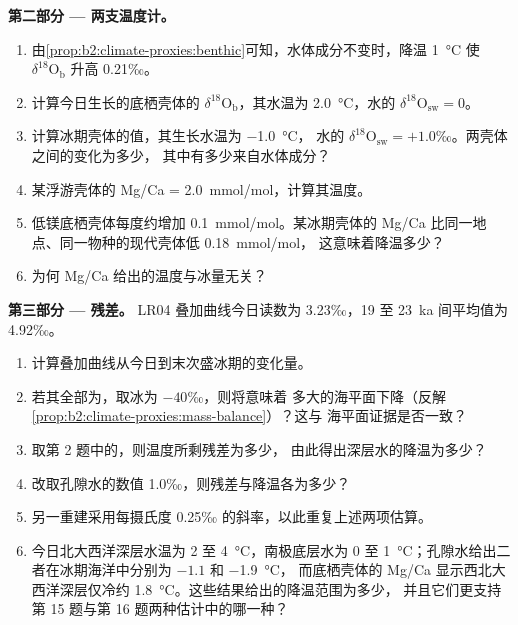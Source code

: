 \begin{problem}
\medskip\noindent\textbf{第二部分 --- 两支温度计。}
\begin{enumerate}[resume]
  \item 由\cref{prop:b2:climate-proxies:benthic}可知，水体成分不变时，降温 \qty{1}{\celsius} 使
        $\delta^{18}\mathrm{O}_{\mathrm{b}}$ 升高 \num{0.21}‰。
  \item 计算今日生长的底栖壳体的 $\delta^{18}\mathrm{O}_{\mathrm{b}}$，其水温为
        \qty{2.0}{\celsius}，水的 $\delta^{18}\mathrm{O}_{\mathrm{sw}} = 0$。
  \item 计算冰期壳体的值，其生长水温为 \qty{-1.0}{\celsius}，
        水的 $\delta^{18}\mathrm{O}_{\mathrm{sw}} = +1.0$‰。两壳体之间的变化为多少，
        其中有多少来自水体成分？
  \item 某浮游壳体的 Mg/Ca = \qty{2.0}{mmol/mol}，计算其温度。
  \item 低镁底栖壳体每度约增加 \qty{0.1}{mmol/mol}。某冰期壳体的
        Mg/Ca 比同一地点、同一物种的现代壳体低 \qty{0.18}{mmol/mol}，
        这意味着降温多少？
  \item 为何 Mg/Ca 给出的温度与冰量无关？
\end{enumerate}

\medskip\noindent\textbf{第三部分 --- 残差。}
LR04 叠加曲线今日读数为 \num{3.23}‰，19 至
\qty{23}{ka} 间平均值为 \num{4.92}‰。
\begin{enumerate}[resume]
  \item 计算叠加曲线从今日到末次盛冰期的变化量。
  \item 若其全部为，取冰为 $-40$‰，则将意味着
        多大的海平面下降（反解\cref{prop:b2:climate-proxies:mass-balance}）？这与
        海平面证据是否一致？
  \item 取第 2 题中的，则温度所剩残差为多少，
        由此得出深层水的降温为多少？
  \item 改取孔隙水的数值 \num{1.0}‰，则残差与降温各为多少？
  \item 另一重建采用每摄氏度 \num{0.25}‰ 的斜率，以此重复上述两项估算。
  \item 今日北大西洋深层水温为 2 至 \qty{4}{\celsius}，南极底层水为
        0 至 \qty{1}{\celsius}；孔隙水给出二者在冰期海洋中分别为 $-1.1$ 和 \qty{-1.9}{\celsius}，
        而底栖壳体的 Mg/Ca 显示西北大西洋深层仅冷约
        \qty{1.8}{\celsius}。这些结果给出的降温范围为多少，
        并且它们更支持第 15 题与第 16 题两种估计中的哪一种？
\end{enumerate}


\end{problem}
